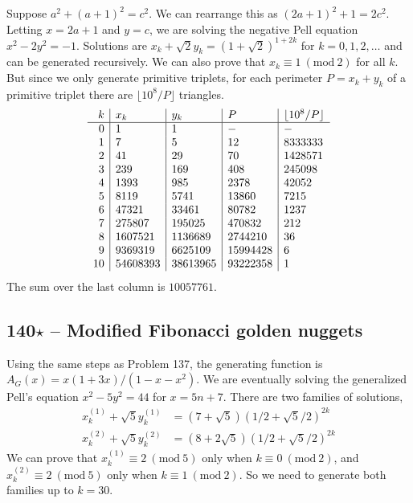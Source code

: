 \documentclass{article}
\newcommand{\Mod}[1]{\ (\mathrm{mod}\ #1)}
\begin{document}
Suppose $a^2 + (a+1)^2 = c^2$. 
We can rearrange this as $(2a+1)^2 + 1 = 2c^2$. 
Letting $x = 2a+1$ and $y = c$, we are solving the negative Pell equation $x^2 - 2y^2 = -1$. 
Solutions are $x_k + \sqrt{2} y_k = (1+\sqrt{2})^{1+2k}$ for $k = 0, 1, 2, \dotsc$ and can be generated recursively. 
We can also prove that $x_k \equiv 1 \Mod{2}$ for all $k$.
But since we only generate primitive triplets, for each perimeter $P = x_k + y_k$ of a primitive triplet there are $\lfloor 10^8/P \rfloor$ triangles.
\begin{align*}
	\begin{array}{r | l | l | l | l }
	k & x_k & y_k & P & \lfloor 10^8 / P \rfloor \\ \hline
	0 & 1 & 1 & - & - \\
	1 & 7 & 5 & 12 & 8333333 \\
	2 & 41 & 29 & 70 & 1428571 \\
	3 & 239 & 169 & 408 & 245098 \\
	4 & 1393 & 985 & 2378 & 42052 \\
	5 & 8119 & 5741 & 13860 & 7215 \\
	6 & 47321 & 33461 & 80782 & 1237 \\
	7 & 275807 & 195025 & 470832 & 212 \\
	8 & 1607521 & 1136689 & 2744210 & 36 \\
	9 & 9369319 & 6625109 & 15994428 & 6 \\
	10 & 54608393 & 38613965 & 93222358 & 1  \\
	\end{array}
\end{align*}
The sum over the last column is $\boxed{10057761}$.

\subsection*{140$\star$ -- Modified Fibonacci golden nuggets} 
Using the same steps as Problem 137, the generating function is $A_G(x) = x(1+3x)/(1-x-x^2)$. 
We are eventually solving the generalized Pell's equation $x^2 - 5y^2 = 44$ for $x = 5n+7$. 
There are two families of solutions, 
\begin{align*}
	x_k^{(1)} + \sqrt{5} y_k^{(1)} &= (7 + \sqrt{5})(1/2 + \sqrt{5}/2)^{2k} \\
	x_k^{(2)} + \sqrt{5} y_k^{(2)} &= (8 + 2\sqrt{5})(1/2 + \sqrt{5}/2)^{2k}
\end{align*}
We can prove that $x_k^{(1)} \equiv 2 \Mod 5$ only when $k \equiv 0 \Mod 2$, and $x_k^{(2)} \equiv 2 \Mod 5$ only when $k \equiv 1 \Mod 2$.
So we need to generate both families up to $k=30$.
\end{document}
